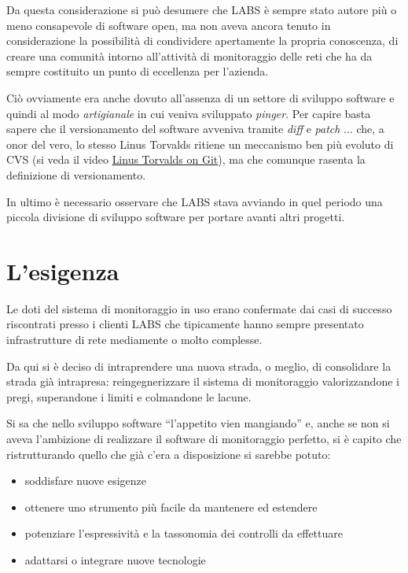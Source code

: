 \documentclass[a4wide,10pt,italian]{manual}
\begin{document}
Da questa considerazione si può desumere che LABS è sempre stato autore più o meno consapevole di software open,
ma non aveva ancora tenuto in considerazione la possibilità di condividere apertamente la propria
conoscenza, di creare una comunità intorno all'attività di monitoraggio delle reti che ha da sempre costituito
un punto di eccellenza per l'azienda.

Ciò ovviamente era anche dovuto all'assenza di un settore di sviluppo software e quindi al modo \emph{artigianale}
in cui veniva sviluppato \emph{pinger}. Per capire basta sapere che il versionamento del software avveniva tramite
\emph{diff} e \emph{patch} ... che, a onor del vero, lo stesso Linus Torvalds ritiene un meccanismo ben più evoluto di CVS
(si veda il video \href{http://www.youtube.com/watch?v=4XpnKHJAok8}{Linus Torvalds on Git}), ma che comunque rasenta la definizione di
versionamento.

In ultimo è necessario osservare che LABS stava avviando in quel periodo una piccola divisione di sviluppo software
per portare avanti altri progetti.


\section{L'esigenza}

Le doti del sistema di monitoraggio in uso erano confermate dai casi di successo riscontrati
presso i clienti LABS che tipicamente hanno sempre presentato
infrastrutture di rete mediamente o molto complesse.

Da qui si è deciso di intraprendere una nuova strada, o meglio, di consolidare la strada già intrapresa:
reingegnerizzare il sistema di monitoraggio valorizzandone i pregi, superandone i limiti e colmandone le lacune.

Si sa che nello sviluppo software ``l'appetito vien mangiando'' e, anche se non si aveva l'ambizione
di realizzare il software di monitoraggio perfetto,
si è capito che ristrutturando quello che già c'era a disposizione
si sarebbe potuto:
\begin{itemize}
\item {} 
soddisfare nuove esigenze

\item {} 
ottenere uno strumento più facile da mantenere ed estendere

\item {} 
potenziare l'espressività e la tassonomia dei controlli da effettuare

\item {} 
adattarsi o integrare nuove tecnologie

\end{itemize}
\end{document}
